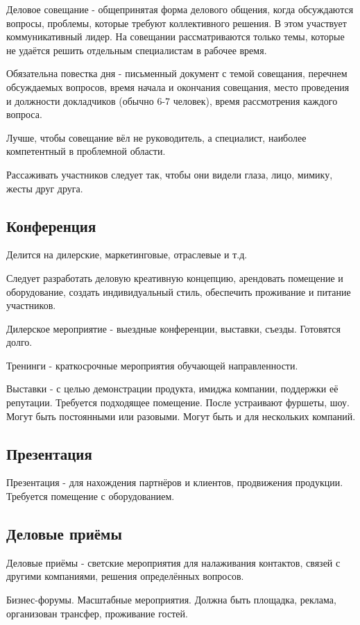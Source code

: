 \documentclass{article}
\begin{document}
Деловое совещание - общепринятая форма делового общения, когда обсуждаются вопросы, проблемы, которые требуют коллективного решения. В этом участвует коммуникативный лидер. На совещании рассматриваются только темы, которые не удаётся решить отдельным специалистам в рабочее время.

Обязательна повестка дня - письменный документ с темой совещания, перечнем обсуждаемых вопросов, время начала и окончания совещания, место проведения и должности докладчиков (обычно 6-7 человек), время рассмотрения каждого вопроса.

Лучше, чтобы совещание вёл не руководитель, а специалист, наиболее компетентный в проблемной области.

Рассаживать участников следует так, чтобы они видели глаза, лицо, мимику, жесты друг друга.

\subsection{Конференция}

Делится на дилерские, маркетинговые, отраслевые и т.д.

Следует разработать деловую креативную концепцию, арендовать помещение и оборудование, создать индивидуальный стиль, обеспечить проживание и питание участников.

Дилерское мероприятие - выездные конференции, выставки, съезды. Готовятся долго.

Тренинги - краткосрочные мероприятия обучающей направленности.

Выставки - с целью демонстрации продукта, имиджа компании, поддержки её репутации. Требуется подходящее помещение. После устраивают фуршеты, шоу. Могут быть постоянными или разовыми. Могут быть и для нескольких компаний.

\subsection{Презентация}

Презентация - для нахождения партнёров и клиентов, продвижения продукции. Требуется помещение с оборудованием.

\subsection{Деловые приёмы}

Деловые приёмы - светские мероприятия для налаживания контактов, связей с другими компаниями, решения определённых вопросов.

Бизнес-форумы. Масштабные мероприятия. Должна быть площадка, реклама, организован трансфер, проживание гостей.
\end{document}
